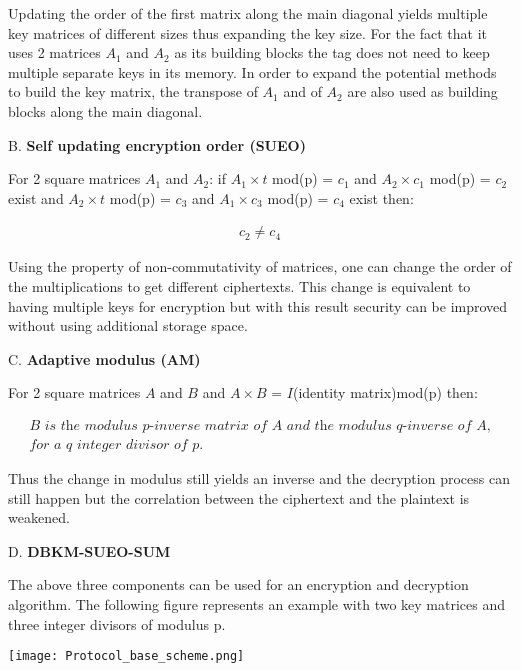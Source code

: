     Updating the order of the first matrix along the main diagonal yields multiple key matrices of different sizes thus expanding the key size. For the fact that 
    it uses 2 matrices $A_1$ and $A_2$ as its building blocks the tag does not need to keep multiple separate keys in its memory. In order to expand the potential
    methods to build the key matrix, the transpose of $A_1$ and  of $A_2$ are also used as building blocks along the main diagonal.

    B. \textbf{Self updating encryption order (SUEO)}

    For 2 square matrices $A_1$ and $A_2$: if $A_1 \times t$ mod(p) = $c_1$ and $A_2 \times c_1$ mod(p) = $c_2$ exist and $A_2 \times t$ mod(p) = $c_3$ and 
    $A_1 \times c_3$ mod(p) = $c_4$ exist then: 
    
    \begin{gather*}
        c_2 \neq c_4
    \end{gather*}

    Using the property of non-commutativity of matrices, one can change the order of the multiplications to get different ciphertexts. This change is equivalent to having multiple keys for
    encryption but with this result security can be improved without using additional storage space.

    C. \textbf{Adaptive modulus (AM)}

    For 2 square matrices $A$ and $B$ and $A \times B$ = $I$(identity matrix)mod(p) then: 
    
    \begin{gather*}
        \textit{B is the modulus p-inverse matrix of A and the modulus q-inverse of A,}\\
        \textit{for a q integer divisor of p.}
    \end{gather*}

    Thus the change in modulus still yields an inverse and the decryption process can still happen but the correlation between the ciphertext and the plaintext is weakened.

    D. \textbf{DBKM-SUEO-SUM}

    The above three components can be used for an encryption and decryption algorithm. The following figure represents an example with two key matrices and three
    integer divisors of modulus p.

    \begin{center}
    \texttt{[image: Protocol\_base\_scheme.png]}
    \end{center}

